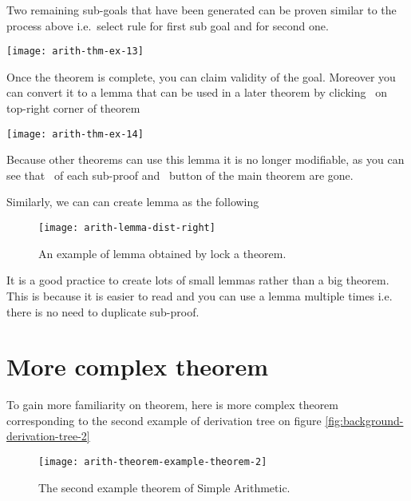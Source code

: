 \documentclass[master.tex]{subfiles}
\begin{document}
Two remaining sub-goals that have been generated can be proven similar to the
process above i.e.\ select rule  for first sub goal and
 for second one.

\begin{center}
\texttt{[image: arith-thm-ex-13]}
\end{center}

Once the theorem is complete, you can claim validity of the goal. Moreover you
can convert it to a lemma that can be used in a later theorem by clicking
\lockButton\ on top-right corner of theorem

\begin{center}
\texttt{[image: arith-thm-ex-14]}
\end{center}

Because other theorems can use this lemma it is no longer modifiable, as you
can see that \closeButton\ of each sub-proof and \resetButton\ button of the
main theorem are gone.

\newpage

Similarly, we can can create lemma  as the following

\hspace{1ex}

\begin{figure}[H]
    \centering
\begin{minipage}{\textwidth}
    \texttt{[image: arith-lemma-dist-right]}
\end{minipage}
\caption{An example of lemma obtained by lock a theorem.}
\label{fig:arith-lemma-dist-right}
\end{figure}

\hspace{1ex}

It is a good practice to create lots of small lemmas rather than a big theorem.
This is because it is easier to read and you can use a lemma multiple times i.e.
there is no need to duplicate sub-proof.

\section{More complex theorem}
\label{sec:arith-complex-theorem}

To gain more familiarity on theorem, here is more complex theorem corresponding
to the second example of derivation tree on figure
\ref{fig:background-derivation-tree-2}

\begin{figure}[H]
    \centering
\begin{minipage}{\textwidth}
    \texttt{[image: arith-theorem-example-theorem-2]}
\end{minipage}
\caption{The second example theorem of Simple Arithmetic.}
\label{fig:arith-theorem-example-theorem-2}
\end{figure}
\end{document}
